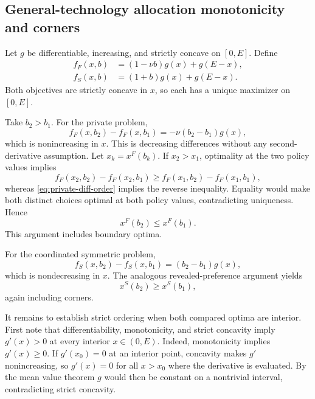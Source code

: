 \subsection{General-technology allocation monotonicity and corners}
Let $g$ be differentiable, increasing, and strictly concave on $[0,E]$. Define
\begin{align}
 f_F(x,b)&=(1-\nu b)g(x)+g(E-x),\\
 f_S(x,b)&=(1+b)g(x)+g(E-x).
\end{align}
Both objectives are strictly concave in $x$, so each has a unique maximizer on $[0,E]$.

Take $b_2>b_1$. For the private problem,
\begin{equation}
 f_F(x,b_2)-f_F(x,b_1)=-\nu(b_2-b_1)g(x),
 \label{eq:private-diff-order}
\end{equation}
which is nonincreasing in $x$. This is decreasing differences without any second-derivative assumption. Let $x_k=x^F(b_k)$. If $x_2>x_1$, optimality at the two policy values implies
\begin{equation}
 f_F(x_2,b_2)-f_F(x_2,b_1)
 \geq
 f_F(x_1,b_2)-f_F(x_1,b_1),
\end{equation}
whereas \eqref{eq:private-diff-order} implies the reverse inequality. Equality would make both distinct choices optimal at both policy values, contradicting uniqueness. Hence
\begin{equation}
 x^F(b_2)\leq x^F(b_1).
\end{equation}
This argument includes boundary optima.

For the coordinated symmetric problem,
\begin{equation}
 f_S(x,b_2)-f_S(x,b_1)=(b_2-b_1)g(x),
 \label{eq:coord-diff-order}
\end{equation}
which is nondecreasing in $x$. The analogous revealed-preference argument yields
\begin{equation}
 x^S(b_2)\geq x^S(b_1),
\end{equation}
again including corners.

It remains to establish strict ordering when both compared optima are interior. First note that differentiability, monotonicity, and strict concavity imply $g'(x)>0$ at every interior $x\in(0,E)$. Indeed, monotonicity implies $g'(x)\geq0$. If $g'(x_0)=0$ at an interior point, concavity makes $g'$ nonincreasing, so $g'(x)=0$ for all $x>x_0$ where the derivative is evaluated. By the mean value theorem $g$ would then be constant on a nontrivial interval, contradicting strict concavity.

